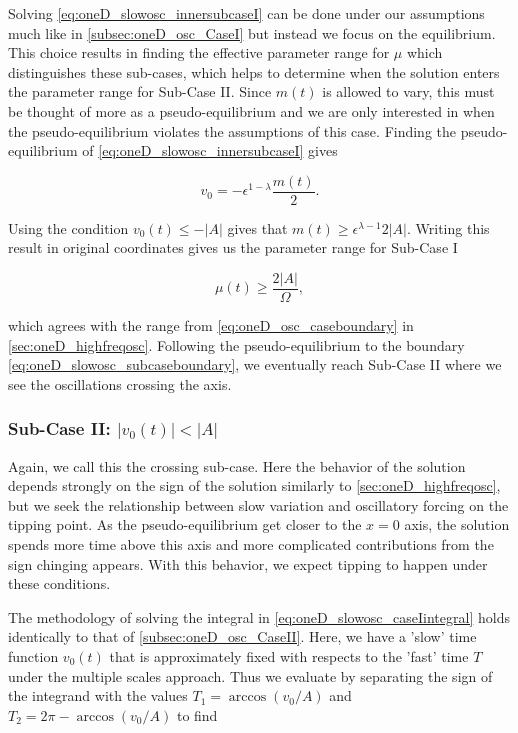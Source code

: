 Solving \eqref{eq:oneD_slowosc_innersubcaseI} can be done under our assumptions much like in \autoref{subsec:oneD_osc_CaseI} but instead we focus on the equilibrium. This choice results in finding the effective parameter range for $\mu$ which distinguishes these sub-cases, which helps to determine when the solution enters the parameter range for Sub-Case II. Since $m(t)$ is allowed to vary, this must be thought of more as a pseudo-equilibrium and we are only interested in when the pseudo-equilibrium violates the assumptions of this case. Finding the pseudo-equilibrium of \eqref{eq:oneD_slowosc_innersubcaseI} gives

\begin{equation*}
v_0=-\epsilon^{1-\lambda}\frac{m(t)}{2}.
\end{equation*}

Using the condition $v_0(t)\le -|A|$ gives that $m(t)\ge \epsilon^{\lambda-1}2|A|$. Writing this result in original coordinates gives us the parameter range for Sub-Case I

\begin{equation}\label{eq:oneD_slowosc_subcaseboundary}
\mu(t)\ge \frac{2 |A|}{\Omega},
\end{equation}

which agrees with the range from \eqref{eq:oneD_osc_caseboundary} in \autoref{sec:oneD_highfreqosc}. Following the pseudo-equilibrium to the boundary \eqref{eq:oneD_slowosc_subcaseboundary}, we eventually reach Sub-Case II where we see the oscillations crossing the axis.

\subsubsection{Sub-Case II: $|v_0(t)|< |A|$}
\label{subsubsec:oneD_slowosc_subcaseII}

Again, we call this the crossing sub-case. Here the behavior of the solution depends strongly on the sign of the solution similarly to \autoref{sec:oneD_highfreqosc}, but we seek the relationship between slow variation and oscillatory forcing on the tipping point. As the pseudo-equilibrium get closer to the $x=0$ axis, the solution spends more time above this axis and more complicated contributions from the sign chinging appears. With this behavior, we expect tipping to happen under these conditions.

The methodology of solving the integral in \eqref{eq:oneD_slowosc_caseIintegral} holds identically to that of \autoref{subsec:oneD_osc_CaseII}. Here, we have a 'slow' time function $v_0(t)$ that is approximately fixed with respects to the 'fast' time $T$ under the multiple scales approach. Thus we evaluate by separating the sign of the integrand with the values $T_1=\arccos(v_0/A)$ and $T_2 = 2\pi-\arccos(v_0/A)$ to find

